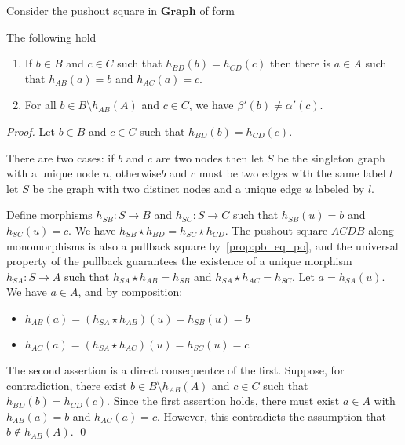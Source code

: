 \begin{lemma}
    \label{lem:b_c_same_img_exist_a}
    Consider the pushout square in $\mathbf{Graph}$ of form
    \begin{center}{\normalfont
    }\end{center} 
    The following hold 
    \begin{enumerate}
        \item  If $ b\in B $ and $ c \in C $ such that $ h_{BD}(b) = h_{CD}(c) $ then there is $ a \in A $ such that $ h_{AB}(a) = b $ and $ h_{AC}(a)= c $.
        \item  For all \( b \in B \setminus h_{AB}(A) \) and \( c \in C \), we have \( \beta'(b) \neq \alpha'(c) \).
    \end{enumerate}
\end{lemma}
\begin{proof}
     Let \( b \in B \) and \( c \in C \) such that \( h_{BD}(b) = h_{CD}(c) \). 
     
     There are two cases: if $b$ and $c$ are two nodes then let \( S \) be the singleton graph with a unique node \( u \), otherwise\textemdash$b$ and $c$ must be two edges with the same label $l$\textemdash let \( S \) be the graph with two distinct nodes and a unique edge \( u \) labeled by $l$.
     
     Define morphisms \( h_{SB}: S \to B \) and \( h_{SC}: S \to C \) such that \( h_{SB}(u) = b \) and \( h_{SC}(u) = c \). We have \( h_{SB} \star h_{BD} = h_{SC} \star h_{CD} \). The pushout square \( ACDB \) along monomorphisms is also a pullback square by~\autoref{prop:pb_eq_po}, and the universal property of the pullback guarantees the existence of a unique morphism \( h_{SA}: S \to A \) such that \( h_{SA} \star h_{AB} = h_{SB} \) and \( h_{SA} \star h_{AC} = h_{SC} \). Let \( a = h_{SA}(u) \). We have \( a \in A \), and by composition: 
     \begin{itemize}
        \item \(h_{AB}(a) = (h_{SA} \star h_{AB})(u) = h_{SB}(u) = b \)
        \item \(h_{AC}(a) = (h_{SA} \star h_{AC})(u) = h_{SC}(u) = c\)
     \end{itemize} 

    The second assertion is a direct consequentce of the first. Suppose, for contradiction, there exist \( b \in B \setminus h_{AB}(A) \) and \( c \in C \) such that \( h_{BD}(b) = h_{CD}(c) \). Since the first assertion holds, there must exist \( a \in A \) with \( h_{AB}(a) = b \) and \( h_{AC}(a) = c \). However, this contradicts the assumption that \( b \notin h_{AB}(A) \).
    \qed
\end{proof}

